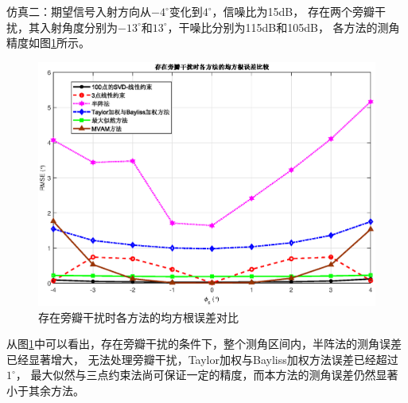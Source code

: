 \documentclass[master]{thesis-uestc}
\begin{document}
仿真二：期望信号入射方向从$-4^\circ$变化到$4^\circ$，信噪比为15dB，
存在两个旁瓣干扰，其入射角度分别为$-13^\circ$和$13^\circ$，干噪比分别为115dB和105dB，
各方法的测角精度如图\ref{SVD-JLC_RMSE_SLJ}所示。
\begin{figure}[H]
    \includegraphics[scale=0.5]{pic/SVD-JLC_RMSE_SLJ.eps}
    \caption{存在旁瓣干扰时各方法的均方根误差对比}
    \label{SVD-JLC_RMSE_SLJ}
\end{figure}
从图\ref{SVD-JLC_RMSE_SLJ}中可以看出，存在旁瓣干扰的条件下，整个测角区间内，半阵法的测角误差已经显著增大，
无法处理旁瓣干扰，Taylor加权与Bayliss加权方法误差已经超过$1^\circ$，
最大似然与三点约束法尚可保证一定的精度，而本方法的测角误差仍然显著小于其余方法。
\end{document}
